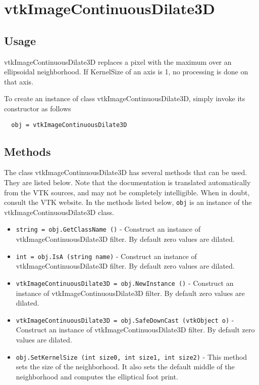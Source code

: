 \section{vtkImageContinuousDilate3D}

\subsection{Usage}

 vtkImageContinuousDilate3D replaces a pixel with the maximum over
 an ellipsoidal neighborhood.  If KernelSize of an axis is 1, no processing
 is done on that axis.

To create an instance of class vtkImageContinuousDilate3D, simply
invoke its constructor as follows
\begin{verbatim}
  obj = vtkImageContinuousDilate3D
\end{verbatim}
\subsection{Methods}

The class vtkImageContinuousDilate3D has several methods that can be used.
  They are listed below.
Note that the documentation is translated automatically from the VTK sources,
and may not be completely intelligible.  When in doubt, consult the VTK website.
In the methods listed below, \verb|obj| is an instance of the vtkImageContinuousDilate3D class.
\begin{itemize}
\item  \verb|string = obj.GetClassName ()| -  Construct an instance of vtkImageContinuousDilate3D filter.
 By default zero values are dilated.

\item  \verb|int = obj.IsA (string name)| -  Construct an instance of vtkImageContinuousDilate3D filter.
 By default zero values are dilated.

\item  \verb|vtkImageContinuousDilate3D = obj.NewInstance ()| -  Construct an instance of vtkImageContinuousDilate3D filter.
 By default zero values are dilated.

\item  \verb|vtkImageContinuousDilate3D = obj.SafeDownCast (vtkObject o)| -  Construct an instance of vtkImageContinuousDilate3D filter.
 By default zero values are dilated.

\item  \verb|obj.SetKernelSize (int size0, int size1, int size2)| -  This method sets the size of the neighborhood.  It also sets the 
 default middle of the neighborhood and computes the elliptical foot print.

\end{itemize}
